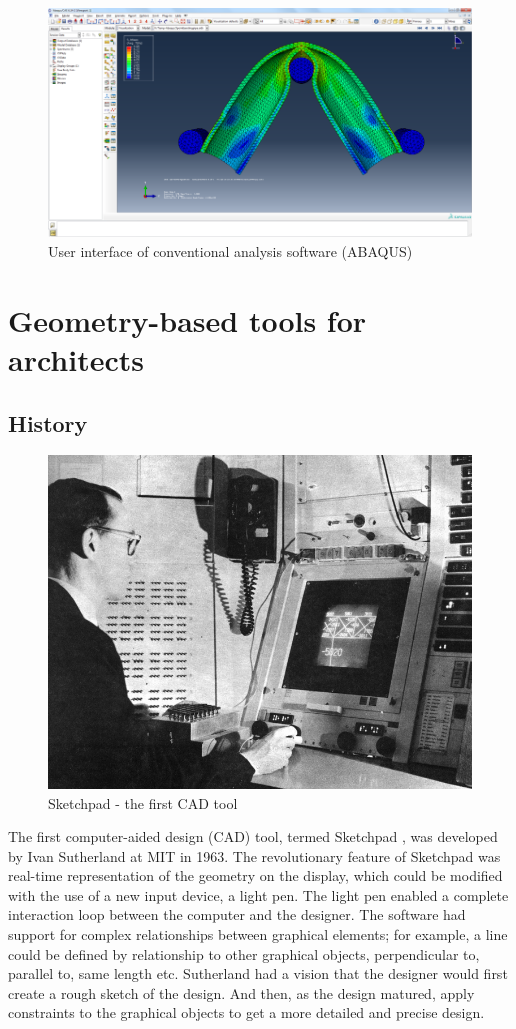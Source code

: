 \begin{figure}
  \includegraphics[width=350pt]{graphics/abaqus.png}
  \caption{User interface of conventional analysis software (ABAQUS)}
  \label{fig:abaqus}
\end{figure}

\section{Geometry-based tools for architects}
\subsection{History}
\begin{figure}
  \includegraphics[width=350pt]{graphics/sketchpad.jpg}
  \caption{Sketchpad - the first CAD tool}
  \label{fig:sketchpad}
\end{figure}
The first computer-aided design (CAD) tool, termed Sketchpad \cite{Aish2005}, was developed by Ivan Sutherland at MIT in 1963. The revolutionary feature of Sketchpad was real-time representation of the geometry on the display, which could be modified with the use of a new input device, a light pen. The light pen enabled a complete interaction loop between the computer and the designer. The software had support for complex relationships between graphical elements; for example, a line could be defined by relationship to other graphical objects, perpendicular to, parallel to, same length etc. Sutherland had a vision that the designer would first create a rough sketch of the design. And then, as the design matured, apply constraints to the graphical objects to get a more detailed and precise design. 

